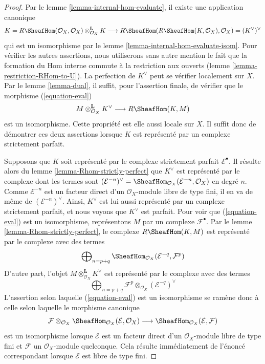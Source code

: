 \begin{proof}
Par le lemme \ref{lemma-internal-hom-evaluate}, il existe une application canonique $$
K = R\SheafHom(\mathcal{O}_X, \mathcal{O}_X)
\otimes_{\mathcal{O}_X}^\mathbf{L} K \longrightarrow
R\SheafHom(R\SheafHom(K, \mathcal{O}_X), \mathcal{O}_X) =
(K^\vee)^\vee
$$ qui est un isomorphisme par le lemme \ref{lemma-internal-hom-evaluate-isom}. Pour vérifier les autres assertions, nous utiliserons sans autre mention le fait que la formation du Hom interne commute à la restriction aux ouverts (lemme \ref{lemma-restriction-RHom-to-U}). La perfection de $K^\vee$ peut se vérifier localement sur $X$. Par le lemme \ref{lemma-dual}, il suffit, pour l'assertion finale, de vérifier que le morphisme (\ref{equation-eval}) $$
M \otimes^\mathbf{L}_{\mathcal{O}_X} K^\vee
\longrightarrow
R\SheafHom(K, M)
$$ est un isomorphisme. Cette propriété est elle aussi locale sur $X$. Il suffit donc de démontrer ces deux assertions lorsque $K$ est représenté par un complexe strictement parfait.

\medskip\noindent

Supposons que $K$ soit représenté par le complexe strictement parfait
$\mathcal{E}^\bullet$. Il résulte alors du lemme \ref{lemma-Rhom-strictly-perfect}
que $K^\vee$ est représenté par le complexe dont les termes sont
$(\mathcal{E}^{-n})^\vee =
\SheafHom_{\mathcal{O}_X}(\mathcal{E}^{-n}, \mathcal{O}_X)$
en degré $n$. Comme $\mathcal{E}^{-n}$ est un facteur direct d'un $\mathcal{O}_X$-module libre de type fini, il en va de même de $(\mathcal{E}^{-n})^\vee$. Ainsi, $K^\vee$ est lui aussi représenté par un complexe strictement parfait, et nous voyons que $K^\vee$ est parfait. Pour voir que (\ref{equation-eval}) est un isomorphisme, représentons
$M$ par un complexe $\mathcal{F}^\bullet$. Par le lemme \ref{lemma-Rhom-strictly-perfect}, le complexe
$R\SheafHom(K, M)$ est représenté par le complexe avec des termes
$$
\bigoplus\nolimits_{n = p + q}
\SheafHom_{\mathcal{O}_X}(\mathcal{E}^{-q}, \mathcal{F}^p)
$$
D'autre part, l'objet $M \otimes^\mathbf{L}_{\mathcal{O}_X} K^\vee$
est représenté par le complexe avec des termes
$$
\bigoplus\nolimits_{n = p + q}
\mathcal{F}^p \otimes_{\mathcal{O}_X} (\mathcal{E}^{-q})^\vee
$$
L'assertion selon laquelle (\ref{equation-eval}) est un isomorphisme se ramène donc à celle selon laquelle le morphisme canonique
$$
\mathcal{F}
\otimes_{\mathcal{O}_X}
\SheafHom_{\mathcal{O}_X}(\mathcal{E}, \mathcal{O}_X)
\longrightarrow
\SheafHom_{\mathcal{O}_X}(\mathcal{E}, \mathcal{F})
$$
est un isomorphisme lorsque $\mathcal{E}$ est un facteur direct d'un $\mathcal{O}_X$-module libre de type fini et $\mathcal{F}$ un $\mathcal{O}_X$-module quelconque. Cela résulte immédiatement de l'énoncé correspondant lorsque
$\mathcal{E}$ est libre de type fini.

\end{proof}

